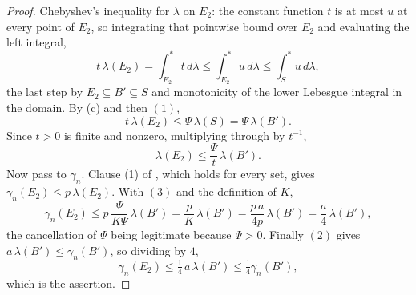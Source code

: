 \begin{proof}
Chebyshev's inequality for $\lambda$ on $E_2$: the constant function $t$ is at
most $u$ at every point of $E_2$, so integrating that pointwise bound over
$E_2$ and evaluating the left integral,
\[
  t\,\lambda(E_2) = \int_{E_2}^{*}t\,d\lambda
    \leq \int_{E_2}^{*}u\,d\lambda
    \leq \int_{S}^{*}u\,d\lambda ,
\]
the last step by $E_2 \subseteq B' \subseteq S$ and monotonicity of the lower
Lebesgue integral in the domain.  By (c) and then $(1)$,
\[
  t\,\lambda(E_2) \leq \Psi\,\lambda(S) = \Psi\,\lambda(B') .
\]
Since $t > 0$ is finite and nonzero, multiplying through by $t^{-1}$,
\begin{equation*}
  \lambda(E_2) \leq \frac{\Psi}{t}\,\lambda(B') . \tag{3}
\end{equation*}
Now pass to $\gamma_n$.  Clause (1) of ,
which holds for every set, gives $\gamma_n(E_2) \leq p\,\lambda(E_2)$.  With
$(3)$ and the definition of $K$,
\[
  \gamma_n(E_2) \leq p\,\frac{\Psi}{K\Psi}\,\lambda(B')
    = \frac{p}{K}\,\lambda(B')
    = \frac{p\,a}{4p}\,\lambda(B')
    = \frac{a}{4}\,\lambda(B') ,
\]
the cancellation of $\Psi$ being legitimate because $\Psi > 0$.  Finally $(2)$
gives $a\,\lambda(B') \leq \gamma_n(B')$, so dividing by $4$,
\[
  \gamma_n(E_2) \leq \tfrac14\,a\,\lambda(B') \leq \tfrac14\gamma_n(B') ,
\]
which is the assertion.
\end{proof}
